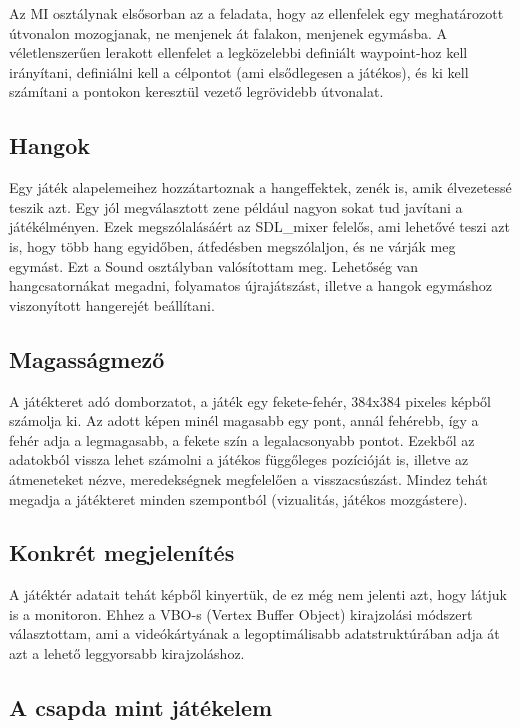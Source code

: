 Az MI osztálynak elsősorban az a feladata, hogy az ellenfelek egy meghatározott útvonalon mozogjanak, ne menjenek át falakon, menjenek egymásba. A véletlenszerűen lerakott ellenfelet a legközelebbi definiált waypoint-hoz kell irányítani, definiálni kell a célpontot (ami elsődlegesen a játékos), és ki kell számítani a pontokon keresztül vezető legrövidebb útvonalat.

\subsection{Hangok}

Egy játék alapelemeihez hozzátartoznak a hangeffektek, zenék is, amik élvezetessé teszik azt. Egy jól megválasztott zene például nagyon sokat tud javítani a játékélményen. Ezek megszólalásáért az SDL\_mixer felelős, ami lehetővé teszi azt is, hogy több hang egyidőben, átfedésben megszólaljon, és ne várják meg egymást. Ezt a Sound osztályban valósítottam meg. Lehetőség van hangcsatornákat megadni, folyamatos újrajátszást, illetve a hangok egymáshoz viszonyított hangerejét beállítani.

\subsection{Magasságmező}

A játékteret adó domborzatot, a játék egy fekete-fehér, 384x384 pixeles képből számolja ki. Az adott képen minél magasabb egy pont, annál fehérebb, így a fehér adja a legmagasabb, a fekete szín a legalacsonyabb pontot. Ezekből az adatokból vissza lehet számolni a játékos függőleges pozícióját is, illetve az átmeneteket nézve, meredekségnek megfelelően a visszacsúszást. Mindez tehát megadja a játékteret minden szempontból (vizualitás, játékos mozgástere).

\subsection{Konkrét megjelenítés}

A játéktér adatait tehát képből kinyertük, de ez még nem jelenti azt, hogy látjuk is a monitoron. Ehhez a VBO-s (Vertex Buffer Object) kirajzolási módszert választottam, ami a videókártyának a legoptimálisabb adatstruktúrában adja át azt a lehető leggyorsabb kirajzoláshoz.

\subsection{A csapda mint játékelem}

